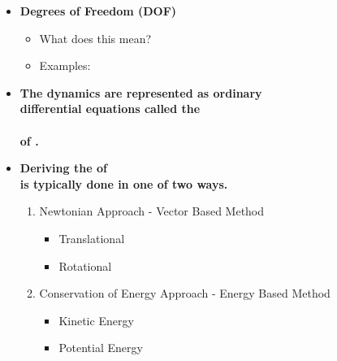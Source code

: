 \documentclass[11pt]{article}
\newcommand{\B}{\color{blue}}
\newcommand{\K}{\color{black}}
\begin{document}
\begin{itemize}
\newpage
\item \textbf{ \Large Degrees of Freedom (DOF) } 
	\begin{itemize}
\item What does this mean? \vspace{25mm}\\
\item Examples:
\end{itemize}

\newpage
	\item \textbf{ \Large The \B dynamics \K are represented as ordinary \vspace{3mm}\\
differential equations called the \\\\ \underline{\hspace{60mm}} of \underline{\hspace{60mm}}.} \vspace{2mm}\\

	\item \textbf{ \Large Deriving the 	\underline{\hspace{60mm}} of \underline{\hspace{60mm}} \vspace{1mm}\\is typically done in one of two ways.} \\
	\begin{enumerate}
		\item Newtonian Approach - Vector Based Method \vspace{3mm}\\
		\begin{itemize}
\item Translational\\
\item Rotational  \vspace{10mm}\\
\end{itemize} 
\item Conservation of Energy Approach - Energy Based Method \vspace{3mm}\\
		\begin{itemize}
\item Kinetic Energy\\
\item Potential Energy\\  
\end{itemize} 
	\end{enumerate}


\end{itemize}
\end{document}
